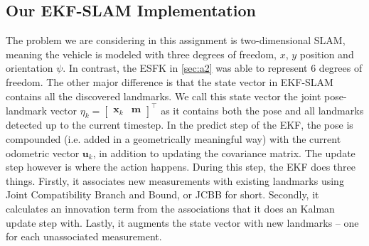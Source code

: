 \subsection{Our EKF-SLAM Implementation}
The problem we are considering in this assignment is two-dimensional SLAM, meaning the vehicle is modeled with three degrees of freedom, $x$, $y$ position and orientation $\psi$. In contrast, the ESFK in \ref{sec:a2} was able to represent 6 degrees of freedom. The other major difference is that the state vector in EKF-SLAM contains all the discovered landmarks. We call this state vector the joint pose-landmark vector $\eta_k = \begin{bmatrix} \mathbf{x}_k & \mathbf{m} \end{bmatrix}^{\top}$ as it contains both the pose and all landmarks detected up to the current timestep. In the predict step of the EKF, the pose is compounded (i.e. added in a geometrically meaningful way) with the current odometric vector $\mathbf{u}_k$, in addition to updating the covariance matrix. The update step however is where the action happens. During this step, the EKF does three things. Firstly, it associates new measurements with existing landmarks using Joint Compatibility Branch and Bound, or JCBB for short. Secondly, it calculates an innovation term from the associations that it does an Kalman update step with. Lastly, it augments the state vector with new landmarks – one for each unassociated measurement.







